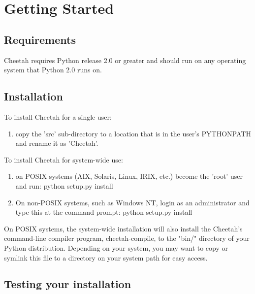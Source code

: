 \section{Getting Started}
\label{gettingStarted}

\subsection{Requirements}
\label{gettingStarted.requirements}

Cheetah requires Python release 2.0 or greater and should run on any
operating system that Python 2.0 runs on.

\subsection{Installation}
\label{gettingStarted.install}

To install Cheetah for a single user:
\begin{enumerate}
\item copy the 'src' sub-directory  to a location that is in the user's
     PYTHONPATH and rename it as 'Cheetah'.
\end{enumerate}

To install Cheetah for system-wide use:
\begin{enumerate}
\item on POSIX systems (AIX, Solaris, Linux, IRIX, etc.) become the 'root' user
     and run: python setup.py install
     
\item On non-POSIX systems, such as Windows NT, login as an administrator and
     type this at the command prompt:  python setup.py install
\end{enumerate}


On POSIX systems, the system-wide installation will also install the Cheetah's
command-line compiler program, cheetah-compile, to the "bin/" directory of your
Python distribution.  Depending on your system, you may want to copy or symlink
this file to a directory on your system path for easy access.

\subsection{Testing your installation}
\label{gettingStarted.test}

